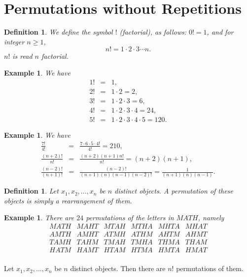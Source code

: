 \documentclass[11pt, openany]{book}
\theoremstyle{change} \theoremheaderfont{\blue\sffamily\bfseries}
\newtheorem{exa}[thm]{Example}
\newtheorem{df}[thm]{Definition}
\theoremstyle{nonumberplain} \theoremheaderfont{\sffamily\bfseries}
\newcommand{\í}{\'{\i}}
\begin{document}
\section{Permutations without Repetitions}
\begin{df}
We define the symbol $!$ (factorial), as follows: $0! = 1$, and for
integer $n \geq 1$, $$n! = 1\cdot 2 \cdot 3 \cdots n. $$ $n!$ is
read $n$ {\em factorial}.
\end{df}
\begin{exa}We have
$$\begin{array}{lll} 1! &=& 1, \\
2!     &=& 1\cdot 2 = 2, \\
3! & = & 1\cdot 2\cdot 3 = 6, \\
4!& = &1\cdot 2\cdot 3\cdot 4 = 24, \\
5! & = & 1\cdot 2\cdot 3 \cdot 4 \cdot 5 = 120. \end{array}$$
\end{exa}
\begin{exa}We have
\renewcommand{\arraystretch}{3}
$$\begin{array}{lll}  \frac{7!}{4!} &=& \frac{7\cdot 6\cdot 5 \cdot
4!}{4!} = 210,    \\ \frac{(n + 2)!}{n!}& =& \frac{(n + 2)(n +
1)n!}{n!} = (n + 2)(n + 1),    \\ \frac{(n - 2)!}{(n + 1)!} & = &
\frac{(n - 2)!}{(n + 1)(n)(n - 1)(n - 2)!} = \frac{1}{(n + 1)(n)(n -
1)}. \end{array}
$$
\end{exa}
\begin{df}
Let $x_1, x_2, \ldots , x_n$ be $n$ distinct objects. A {\em
permutation} of these objects is simply a rearrangement of them.
\end{df}
\begin{exa}
There are $24$ permutations of the letters in $MATH$, namely
$$\begin{array}{llllll} MATH & MAHT & MTAH & MTHA & MHTA &  MHAT\\
 AMTH & AMHT & ATMH & ATHM & AHTM &  AHMT\\
  TAMH & TAHM & TMAH & TMHA & THMA &  THAM\\
   HATM & HAMT & HTAM & HTMA & HMTA &  HMAT\\       \end{array}   $$

\end{exa}
\begin{thm}\label{thm:counting_permutations}
Let $x_1, x_2, \ldots , x_n$ be $n$ distinct objects. Then there are
$n!$ permutations of them.
\end{thm}
\end{document}
